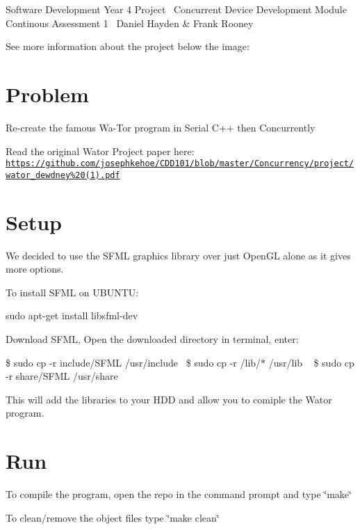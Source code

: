 \begin{center}Software Development Year 4 Project~\newline
 Concurrent Device Development Module~\newline
 Continous Assessment 1~\newline
 Daniel Hayden \& Frank Rooney~\newline
\end{center} 

See more information about the project below the image\+: 

\section*{Problem}

Re-\/create the famous Wa-\/\+Tor program in Serial C++ then Concurrently

Read the original Wator Project paper here\+: \href{https://github.com/josephkehoe/CDD101/blob/master/Concurrency/project/wator_dewdney%20(1).pdf}{\tt https\+://github.\+com/josephkehoe/\+C\+D\+D101/blob/master/\+Concurrency/project/wator\+\_\+dewdney\%20(1).\+pdf}

\section*{Setup}

We decided to use the S\+F\+ML graphics library over just Open\+GL alone as it gives more options.

To install S\+F\+ML on U\+B\+U\+N\+TU\+:

sudo apt-\/get install libsfml-\/dev

Download S\+F\+ML, Open the downloaded directory in terminal, enter\+:

\$ sudo cp -\/r include/\+S\+F\+ML /usr/include~\newline
 \$ sudo cp -\/r /lib/$\ast$ /usr/lib ~\newline
 \$ sudo cp -\/r share/\+S\+F\+ML /usr/share~\newline


This will add the libraries to your H\+DD and allow you to comiple the Wator program.

\section*{Run}

To compile the program, open the repo in the command prompt and type \char`\"{}make\char`\"{}

To clean/remove the object files type \char`\"{}make clean\char`\"{} 